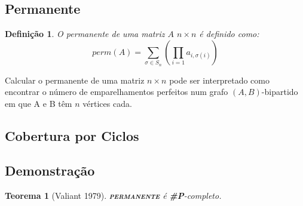 \documentclass[paper=a4, fontsize=11pt]{scrartcl} %
\newtheorem{theorem}{Teorema}
\newtheorem{definition}{Definição}
\newcommand{\perm}{perm}
\newcommand{\SP}{\textbf{\#P}\xspace}
\newcommand{\prob}[1]{\textsc{\textbf{#1}}}
\begin{document}
\subsection{Permanente}

\begin{definition} O permanente de uma matriz $A$ $n \times n$ é definido como: 
\[
\perm(A) = \sum\limits_{\sigma \in S_n} \left( \prod\limits_{i=1}a_{i,\sigma(i)} \right)
\]

\end{definition}

Calcular o permanente de uma matriz $n \times n$ pode ser interpretado como encontrar o número de emparelhamentos perfeitos num grafo $(A, B)$-bipartido em que A e B têm $n$ vértices cada.

\subsection{Cobertura por Ciclos}


\subsection{Demonstração}

\begin{theorem}[Valiant 1979] \prob{permanente} é \SP-completo.
\end{theorem}
\end{document}
